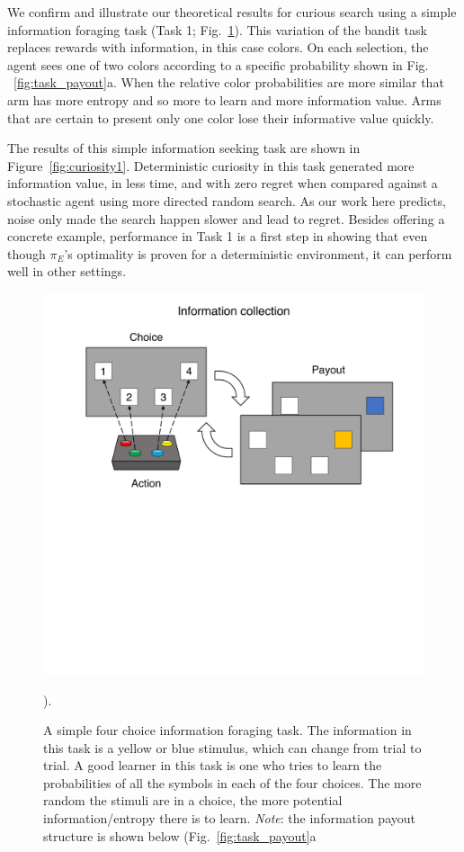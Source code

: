 We confirm and illustrate our theoretical results for curious search using a simple information foraging task (Task 1; Fig.~\ref{fig:task_outline1}). This variation of the bandit task \cite{Sutton2018} replaces rewards with information, in this case colors. On each selection, the agent sees one of two colors according to a specific probability shown in Fig. ~\ref{fig:task_payout}a. When the relative color probabilities are more similar that arm has more entropy and so more to learn and more information value. Arms that are certain to present only one color lose their informative value quickly.

The results of this simple information seeking task are shown in Figure~\ref{fig:curiosity1}. Deterministic curiosity in this task generated more information value, in less time, and with zero regret when compared against a stochastic agent using more directed random search. As our work here predicts, noise only made the search happen slower and lead to regret. Besides offering a concrete example, performance in Task 1 is a first step in showing that even though $\pi_E$'s optimality is proven for a deterministic environment, it can perform well in other settings.

\begin{figure}

	\includegraphics[width=0.7\linewidth]{img/task_outline1.pdf} 
	\caption{A simple four choice information foraging task. The information in this task is a yellow or blue stimulus, which can change from trial to trial. A good learner in this task is one who tries to learn the probabilities of all the symbols in each of the four choices. The more random the stimuli are in a choice, the more potential information/entropy there is to learn. \textit{Note}: the information payout structure is shown below (Fig.~\ref{fig:task_payout}a}).
	\label{fig:task_outline1} 
\end{figure}

